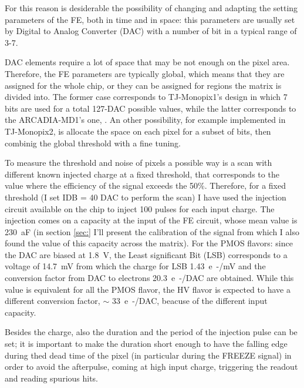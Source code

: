         For this reason is desiderable the possibility of changing and adapting the setting parameters of the FE, both in time and in space: this parameters are usually set by Digital to Analog Converter (DAC) with a number of bit in a typical range of 3-7.

        DAC elements require a lot of space that may be not enough on the pixel area. Therefore, the FE parameters are typically global, which means that they are assigned for the whole chip, or they can be assigned for regions the matrix is divided into. 
        The former case corresponds to TJ-Monopix1's design in which 7 bits are used for a total 127-DAC possible values, while the latter corresponds to the ARCADIA-MD1's one, . 
        An other possibility, for example implemented in TJ-Monopix2, is allocate the space on each pixel for a subset of bits, then combinig the global threshold with a fine tuning. 

        To measure the threshold and noise of pixels a possible way is a scan with different known injected charge at a fixed threshold, that corresponds to the value where the efficiency of the signal exceeds the 50\%.
        Therefore, for a fixed threshold (I set IDB = 40 DAC to perform the scan) I have used the injection circuit available on the chip to inject 100 pulses for each input charge. 
        The injection comes on a capacity at the input of the FE circuit, whose mean value is \SI{230}{aF} (in section \ref{sec:} I'll present the calibration of the signal from which I also found the value of this capacity across the matrix). 
        For the PMOS flavors: since the DAC are biased at \SI{1.8}{V}, the Least significant Bit (LSB) corresponds to a voltage of \SI{14.7}{mV} from which the charge for LSB \SI{1.43}{e-/mV} and the conversion factor from DAC to electrons \SI{20.3}{e-/DAC} are obtained. 
        While this value is equivalent for all the PMOS flavor, the HV flavor is expected to have a different conversion factor, $\sim$ \SI{33}{e-/DAC}, beacuse of the different input capacity. 
    
        Besides the charge, also the duration and the period of the injection pulse can be set; it is important to make the duration short enough to have the falling edge during thed dead time of the pixel (in particular during the FREEZE signal) in order to avoid the afterpulse, coming at high input charge, triggering the readout and reading spurious hits. 

